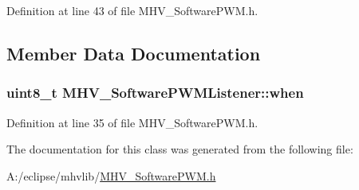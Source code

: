 Definition at line 43 of file M\-H\-V\-\_\-\-Software\-P\-W\-M.\-h.



\subsection{Member Data Documentation}
\hypertarget{class_m_h_v___software_p_w_m_listener_ab3f5e55e2768e82057462c6af8514904}{
\subsubsection[{when}]{\setlength{\rightskip}{0pt plus 5cm}uint8\-\_\-t M\-H\-V\-\_\-\-Software\-P\-W\-M\-Listener\-::when}}\label{class_m_h_v___software_p_w_m_listener_ab3f5e55e2768e82057462c6af8514904}


Definition at line 35 of file M\-H\-V\-\_\-\-Software\-P\-W\-M.\-h.



The documentation for this class was generated from the following file\-:\begin{DoxyCompactItemize}
\item 
A\-:/eclipse/mhvlib/\hyperlink{_m_h_v___software_p_w_m_8h}{M\-H\-V\-\_\-\-Software\-P\-W\-M.\-h}\end{DoxyCompactItemize}
